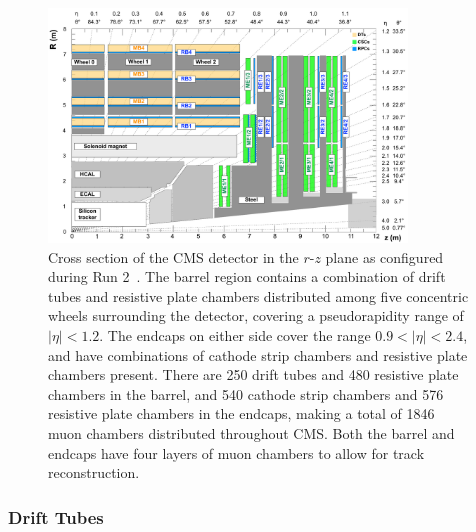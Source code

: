 \begin{figure}[htbp]
  \centering
  \includegraphics[width=0.85\textwidth]{fig/experiment/cms_crosssec.pdf}
  \caption[
    Cross section of the CMS detector in the $r$-$z$ plane as configured during Run 2.
    The barrel region contains a combination of drift tubes and resistive plate chambers distributed among five concentric wheels surrounding the detector, covering a pseudorapidity range of $|\eta|<1.2$.
    The endcaps on either side cover the range $0.9<|\eta|<2.4$, and have combinations of cathode strip chambers and resistive plate chambers present.
    There are 250 drift tubes and 480 resistive plate chambers in the barrel, and 540 cathode strip chambers and 576 resistive plate chambers in the endcaps, making a total of 1846 muon chambers distributed throughout CMS.
    Both the barrel and endcaps have four layers of muon chambers to allow for track reconstruction.
  ]{
    Cross section of the CMS detector in the $r$-$z$ plane as configured during Run 2~\cite{Sirunyan_2018_CMS}.
    The barrel region contains a combination of drift tubes and resistive plate chambers distributed among five concentric wheels surrounding the detector, covering a pseudorapidity range of $|\eta|<1.2$.
    The endcaps on either side cover the range $0.9<|\eta|<2.4$, and have combinations of cathode strip chambers and resistive plate chambers present.
    There are 250 drift tubes and 480 resistive plate chambers in the barrel, and 540 cathode strip chambers and 576 resistive plate chambers in the endcaps, making a total of 1846 muon chambers distributed throughout CMS.
    Both the barrel and endcaps have four layers of muon chambers to allow for track reconstruction.
  }
  \label{fig:CMScrosssec}
\end{figure}

\subsubsection{Drift Tubes}


